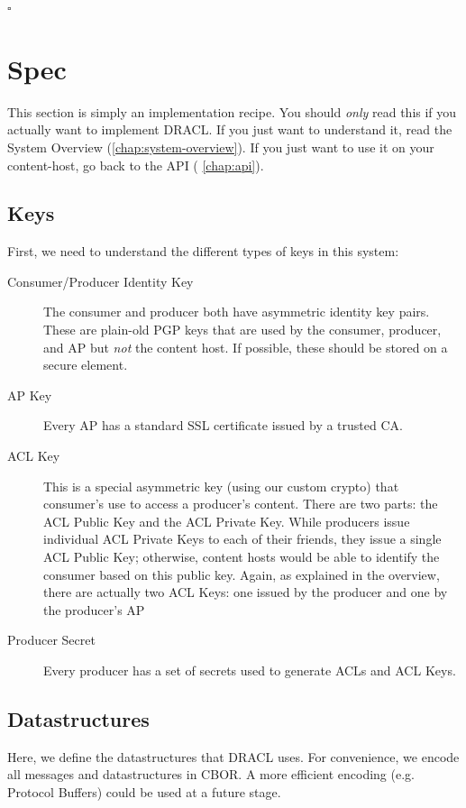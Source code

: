 \documentclass[pdftex,12pt,a4papaer,twoside,notitlepage]{report}
\begin{document}
\begin{appendices}
{\hfill $\square$}

\chapter{Spec}

This section is simply an implementation recipe. You should \emph{only} read
this if you actually want to implement DRACL. If you just want to understand it,
read the System Overview (\cref{chap:system-overview}). If you just want to use
it on your content-host, go back to the API ( \cref{chap:api}).

\section{Keys}

First, we need to understand the different types of keys in this system:

\begin{description}
\item[Consumer/Producer Identity Key] The consumer and producer both have
  asymmetric identity key pairs. These are plain-old PGP keys that are used by
  the consumer, producer, and AP but \emph{not} the content host. If possible,
  these should be stored on a secure element.
\item[AP Key] Every AP has a standard SSL certificate issued by a trusted CA.
\item[ACL Key] This is a special asymmetric key (using our custom crypto) that
  consumer's use to access a producer's content. There are two parts: the ACL
  Public Key and the ACL Private Key. While producers issue individual ACL
  Private Keys to each of their friends, they issue a single ACL Public Key;
  otherwise, content hosts would be able to identify the consumer based on this
  public key. Again, as explained in the overview, there are actually two ACL
  Keys: one issued by the producer and one by the producer's AP
\item[Producer Secret] Every producer has a set of secrets used to generate ACLs
  and ACL Keys.
\end{description}

\section{Datastructures}

Here, we define the datastructures that DRACL uses. For convenience, we encode
all messages and datastructures in CBOR. A more efficient encoding (e.g.
Protocol Buffers) could be used at a future stage.


\end{appendices}
\end{document}
